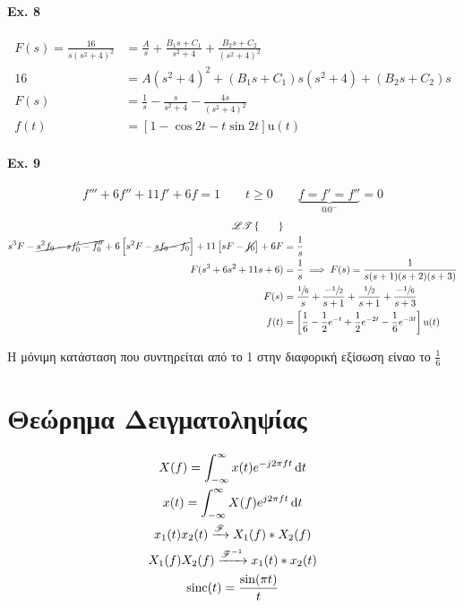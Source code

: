 \documentclass[11pt,a4paper,titlepage,fleqn]{article}
\begin{document}
    \paragraph{Ex. 8}
    \begin{align*}
    F(s) = \frac{16}{s(s^2+4)^2} &=
    \frac{A}{s} + \frac{B_1s + C_1}{s^2+4} + \frac{B_2s+C_2}{(s^2+4)^2} \\
    16 &= A(s^2+4)^2 + (B_1s+C_1)s(s^2+4) + (B_2s+C_2)s \\
    F(s) &= \frac{1}{s} - \frac{s}{s^2+4} - \frac{4s}{(s^2+4)^2} \\
    f(t) &= \left[ 1-\cos 2t - t\sin 2t \right] \mathrm u(t)
    \end{align*}
    
    \paragraph{Ex. 9}
    \[
    f''' + 6f'' + 11f' + 6f = 1 \qquad t\geq 0 \qquad
    \underbrace{f=f'=f''}_{@ 0^-}=0
    \]
    \begin{align*}
    \mathscr{LT}\left\lbrace \qquad \right\rbrace & \\
    s^3F - \cancel{s^2f_0 - sf_0' -f_0''}
    +6 \left[ s^2F-\cancel{sf_0-f_0} \right]
     + 11 \left[ sF - \cancel{f_0} \right] + 6F
    &= \frac{1}{s} \\
    F(s^3+6s^2+11s+6)&= \frac{1}{s}
    \implies F(s) = \frac{1}{s(s+1)(s+2)(s+3)}
    \\ F(s) &= \frac{\sfrac{1}{6} }{s}
    + \frac{-\sfrac{1}{2} }{s+1}
    + \frac{\sfrac{1}{2} }{s+1}
    + \frac{-\sfrac{1}{6} }{s+3} \\
    f(t) &= \left[
    \frac{1}{6}-\frac{1}{2}e^{-t}+\frac{1}{2}e^{-2t}-\frac{1}{6}e^{-3t}
    \right]\mathrm u(t)
    \end{align*}
    
    Η μόνιμη κατάσταση που συντηρείται από το 1 στην διαφορική εξίσωση είναο το
    \( \frac{1}{6} \)
    
    \section{Θεώρημα Δειγματοληψίας}
    \begin{gather*}
    	X(f) = \int_{-\infty}^{\infty} x(t) e^{-j2\pi ft}\dif t\\
    	x(t) = \int_{-\infty}^{\infty} X(f) e^{j2\pi f t}\dif t\\
    	x_1(t) x_2(t) \xrightarrow{\mathscr F} X_1(f)*X_2(f)\\
    	X_1(f) X_2(f) \xrightarrow{\mathscr F^{-1}} x_1(t)*x_2(t)\\
    	\mathrm{sinc} (t) = \frac{\sin(\pi t)}{t}
    \end{gather*}
    
\end{document}
